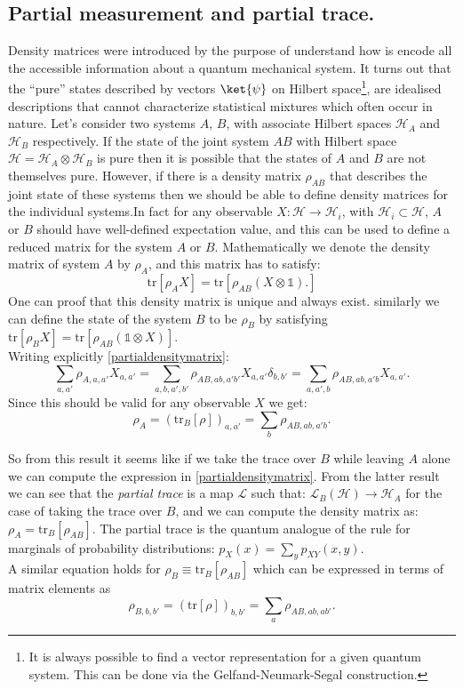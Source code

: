\begin{appendix}
\section{Partial measurement and partial trace.}\label{appendixAparcialtrace}



Density matrices were introduced by the purpose of understand how is encode all the accessible information about a quantum mechanical system. It turns out that the ``pure'' states described by vectors $\ket{\psi}$ on Hilbert space\footnote{It is always possible to find a vector representation for a given quantum system. This can be done via the Gelfand-Neumark-Segal construction.}, are idealised descriptions that cannot characterize statistical mixtures which often occur in nature.  
Let's consider two systems $A$, $B$, with associate Hilbert spaces $\mathcal{H}_A$ and $\mathcal{H}_B$ respectively. If the state of the joint system $AB$ with Hilbert space $\mathcal{H}=\mathcal{H}_A\otimes\mathcal{H}_B$ is pure then it is possible that the states of $A$ and $B$ are not themselves pure. However, if there is a density matrix $\rho_{AB}$ that describes the joint state of these systems then we should be able to define density matrices for the individual systems.In fact for any observable $X:\mathcal{H}\rightarrow\mathcal{H}_{i}$, with $\mathcal{H}_{i}\subset\mathcal{H}$, $A$ or $B$ should have well-defined expectation value, and this can be used to define a reduced matrix for the system $A$ or $B$. Mathematically we denote the density matrix of system $A$ by $\rho_A$, and this matrix has to satisfy:
\begin{equation}
\text{tr}[\rho_AX]=\text{tr}[\rho_{AB}(X\otimes\mathds{1}).]
\label{partialdensitymatrix}
\end{equation}
One can proof that this density matrix is unique and always exist. similarly we can define the state of the system $B$ to be $\rho_B$ by satisfying $\text{tr}[\rho_BX]=\text{tr}[\rho_{AB}(\mathds{1}\otimes X)]$.\\
Writing explicitly  \eqref{partialdensitymatrix}:
\[
\sum_{a,a'}\rho_{A,a,a'}X_{a,a'}=\sum_{a,b,a',b'}
\rho_{AB,ab,a'b'}X_{a,a'}\delta_{b,b'}=\sum_{a,a',b}
\rho_{AB,ab,a'b}X_{a,a'}.
\]
Since this should be valid for any observable $X$ we get:
\[\rho_{A}=(\text{tr}_B[\rho])_{a,a'}=\sum_b\rho_{AB,ab,a'b}.\]

So from this result it seems like if we take the trace over $B$ while leaving $A$ alone we can compute the expression in  \eqref{partialdensitymatrix}. From the latter result we can see that the \textit{partial trace} is a map $\mathcal{L}$ such that: $\mathcal{L}_{B}(\mathcal{H})\rightarrow\mathcal{H}_{A}$ for the case of taking the trace over $B$, and we can compute the density matrix as: $\rho_{A}=\text{tr}_{B}[\rho_{AB}]$. The partial trace is the quantum analogue of the rule for marginals of probability distributions: $p_{X}(x)=\sum_{y}p_{XY}(x,y)$.\\
A similar equation holds for 
$\rho_B\equiv\text{tr}_B[\rho_{AB}]$
 which can be expressed in terms of matrix elements as
\[
\rho_{B,b,b'}=(\text{tr}[\rho])_{b,b'}=\sum_a\rho_{AB,ab,ab'}.
\]


\end{appendix}
